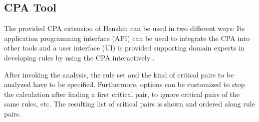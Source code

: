 \subsection*{CPA Tool}
The provided CPA extension of Henshin can be used in two different ways: Its application programming interface (API) can be used to integrate the CPA into other tools and a user interface (UI) is provided supporting domain experts in developing rules by using the CPA interactively \cite{mens2007analysing}.

After invoking the analysis, the rule set and the kind of critical pairs to be analyzed have to be specified. Furthermore, options can be customized to stop the calculation after finding a first critical pair, to ignore critical pairs of the same rules, etc. The resulting list of critical pairs is shown and ordered along rule pairs. 




